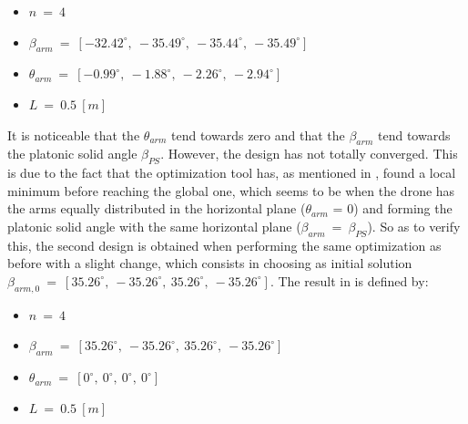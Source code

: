 {\small\begin{itemize}
  \item $n\ =\ 4$
  \item $\beta_{arm}\ =\ [-32.42^{\circ},\  -35.49^{\circ},\  -35.44^{\circ},\  -35.49^{\circ}]$
  \item $\theta_{arm}\ =\ [-0.99^{\circ},\  -1.88^{\circ},\  -2.26^{\circ},\  -2.94^{\circ}]$
  \item $L\ =\ 0.5\ [m]$
\end{itemize}}

It is noticeable that the $\theta_{arm}$ tend towards zero and that the $\beta_{arm}$
tend towards the platonic solid angle $\beta_{PS}$. However, the design has not totally
converged. This is due to the fact that the optimization tool has, as mentioned in
, found a local minimum before reaching the global one,
which seems to be when the drone has the arms equally distributed in the horizontal
plane ($\theta_{arm}$ = 0) and forming the platonic solid angle with the same horizontal
plane ($\beta_{arm}\ =\ \beta_{PS}$). So as to verify this, the second
design is obtained when performing the same optimization as before with a slight
change, which consists in choosing as initial solution $\beta_{arm,0} \ =\
[35.26^{\circ},\  -35.26^{\circ},\  35.26^{\circ},\  -35.26^{\circ}]$. The result
in \Cref{fig:Quadcopter_1} is defined by:

{\small\begin{itemize}
  \item $n\ =\ 4$
  \item $\beta_{arm}\ =\ [35.26^{\circ},\  -35.26^{\circ},\  35.26^{\circ},\  -35.26^{\circ}]$
  \item $\theta_{arm}\ =\ [0^{\circ},\  0^{\circ},\  0^{\circ},\  0^{\circ}]$
  \item $L\ =\ 0.5\ [m]$
\end{itemize}}

